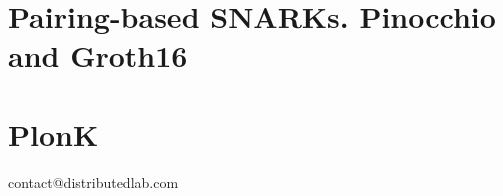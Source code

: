 \documentclass{zkdl-template-105x135-nohead}
\begin{document}
    

    \section[Pairing-based SNARKs]{Pairing-based SNARKs. Pinocchio and Groth16} \label{section:groth16}

    

    \section{PlonK} \label{section:plonk}

    


    \newpage
    \pagestyle{empty}
    
    \ifodd\value{page}
        \newpage
    \fi
    
    \vspace*{\fill}
    
    \begin{center}
        contact@distributedlab.com
    \end{center}
    
    \vspace*{\fill}
\end{document}
